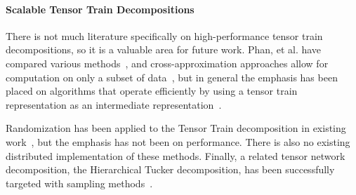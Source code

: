 \paragraph{Scalable Tensor Train Decompositions}
There is not much literature specifically on high-performance tensor train decompositions, so it is a valuable area for future work. Phan, et al. have compared various methods~\cite{Phan2016TensorNF}, and cross-approximation approaches allow for computation on only a subset of data~\cite{ttcross}, but in general the emphasis has been placed on algorithms that operate efficiently by using a tensor train representation as an intermediate representation~\cite{cichocki2}. 

Randomization has been applied to the Tensor Train decomposition in existing work~\cite{HSW17}, but the emphasis has not been on performance. There is also no existing distributed implementation of these methods. Finally, a related tensor network decomposition, the Hierarchical Tucker decomposition, has been successfully targeted with sampling methods~\cite{SHT}.
